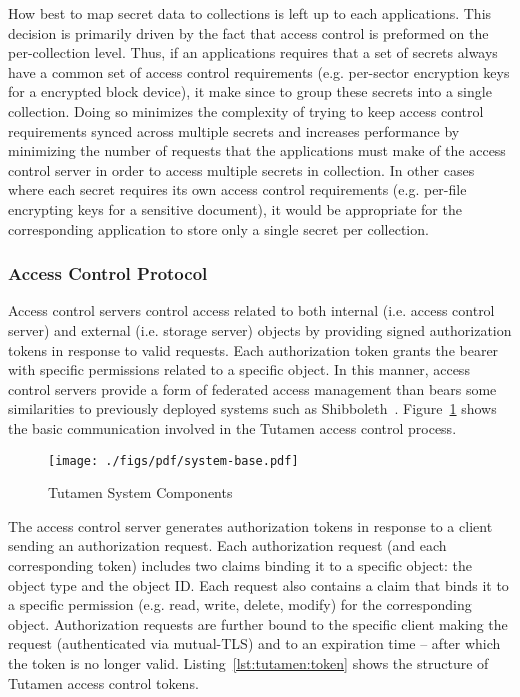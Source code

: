 How best to map secret data to collections is left up to each
applications. This decision is primarily driven by the fact that
access control is preformed on the per-collection level. Thus, if an
applications requires that a set of secrets always have a common set
of access control requirements (e.g. per-sector encryption keys for a
encrypted block device), it make since to group these secrets into a
single collection. Doing so minimizes the complexity of trying to keep
access control requirements synced across multiple secrets and
increases performance by minimizing the number of requests that the
applications must make of the access control server in order to access
multiple secrets in collection. In other cases where each secret
requires its own access control requirements (e.g. per-file encrypting
keys for a sensitive document), it would be appropriate for the
corresponding application to store only a single secret per
collection.

\subsubsection{Access Control Protocol}

Access control servers control access related to both internal
(i.e. access control server) and external (i.e. storage server)
objects by providing signed authorization tokens in response to valid
requests. Each authorization token grants the bearer with specific
permissions related to a specific object. In this manner, access
control servers provide a form of federated access management than
bears some similarities to previously deployed systems such as
Shibboleth~\cite{leandro2012}. Figure~\ref{fig:tutamen:systembase}
shows the basic communication involved in the Tutamen access control
process.

\begin{figure}[th]
  \centering
  \texttt{[image: ./figs/pdf/system-base.pdf]}
  \caption{Tutamen System Components}
  \label{fig:tutamen:systembase}
\end{figure}

The access control server generates authorization tokens in response
to a client sending an authorization request. Each authorization
request (and each corresponding token) includes two claims binding it
to a specific object: the object type and the object ID. Each request
also contains a claim that binds it to a specific permission
(e.g. read, write, delete, modify) for the corresponding
object. Authorization requests are further bound to the specific
client making the request (authenticated via mutual-TLS) and to an
expiration time -- after which the token is no longer
valid. Listing~\ref{lst:tutamen:token} shows the structure of Tutamen
access control tokens.

